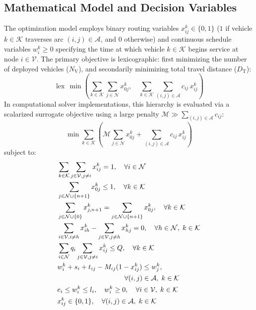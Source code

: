 \documentclass{ieeeaccess}
\newcommand{\NV}{{N_\mathrm{V}}}
\newcommand{\TD}{{D_\mathrm{T}}}
\begin{document}
\subsection{Mathematical Model and Decision Variables}
The optimization model employs binary routing variables $x_{ij}^k \in \{0, 1\}$ ($1$ if vehicle $k \in \mathcal{K}$ traverses arc $(i, j) \in \mathcal{A}$, and $0$ otherwise) and continuous schedule variables $w_i^k \ge 0$ specifying the time at which vehicle $k \in \mathcal{K}$ begins service at node $i \in \mathcal{V}$. The primary objective is lexicographic: first minimizing the number of deployed vehicles ($\NV$), and secondarily minimizing total travel distance ($\TD$):
\begin{equation}
  \operatorname{lex}\,\min \left( \sum_{k \in \mathcal{K}} \sum_{j \in \mathcal{N}} x_{0j}^k, \quad \sum_{k \in \mathcal{K}} \sum_{(i,j) \in \mathcal{A}} c_{ij}\,x_{ij}^k \right)
  \label{eq:lexicographic_obj}
\end{equation}
In computational solver implementations, this hierarchy is evaluated via a scalarized surrogate objective using a large penalty $\mathcal{M} \gg \sum_{(i,j) \in \mathcal{A}} c_{ij}$:
\begin{equation}
  \min \sum_{k \in \mathcal{K}} \left( \mathcal{M} \sum_{j \in \mathcal{N}} x_{0j}^k + \sum_{(i,j) \in \mathcal{A}} c_{ij}\,x_{ij}^k \right)
  \label{eq:scalarized_obj}
\end{equation}
subject to:
\begin{align}
  &\sum_{k \in \mathcal{K}} \sum_{j \in \mathcal{V}, j \neq i} x_{ij}^k = 1, \quad \forall i \in \mathcal{N} \label{eq:visit_once} \\
  &\sum_{j \in \mathcal{N} \cup \{n+1\}} x_{0j}^k \le 1, \quad \forall k \in \mathcal{K} \label{eq:depot_flow_depart} \\
  &\sum_{j \in \mathcal{N} \cup \{0\}} x_{j, n+1}^k = \sum_{j \in \mathcal{N} \cup \{n+1\}} x_{0j}^k, \quad \forall k \in \mathcal{K} \label{eq:depot_flow_return} \\
  &\sum_{i \in \mathcal{V}, i \neq h} x_{ih}^k - \sum_{j \in \mathcal{V}, j \neq h} x_{hj}^k = 0, \quad \forall h \in \mathcal{N}, \; k \in \mathcal{K} \label{eq:flow_conservation} \\
  &\sum_{i \in \mathcal{N}} q_i \sum_{j \in \mathcal{V}, j \neq i} x_{ij}^k \le Q, \quad \forall k \in \mathcal{K} \label{eq:capacity_constraint} \\
  &w_i^k + s_i + t_{ij} - M_{ij} (1 - x_{ij}^k) \le w_j^k, \nonumber \\
  &\hspace{3.4cm} \forall (i, j) \in \mathcal{A}, \; k \in \mathcal{K} \label{eq:time_propagation} \\
  &e_i \le w_i^k \le l_i, \quad w_i^k \ge 0, \quad \forall i \in \mathcal{V}, \; k \in \mathcal{K} \label{eq:variable_domains} \\
  &x_{ij}^k \in \{0, 1\}, \quad \forall (i, j) \in \mathcal{A}, \; k \in \mathcal{K} \label{eq:binary_domains}
\end{align}
\end{document}

